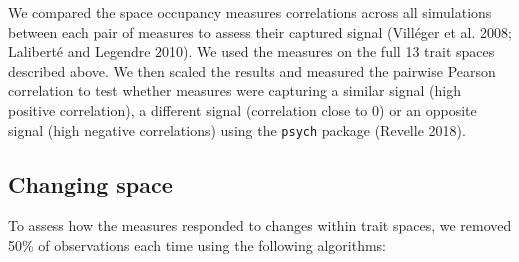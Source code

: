 \documentclass[]{article}
\begin{document}
We compared the space occupancy measures correlations across all
simulations between each pair of measures to assess their captured
signal (Villéger et al. 2008; Laliberté and Legendre 2010). We used the
measures on the full 13 trait spaces described above. We then scaled the
results and measured the pairwise Pearson correlation to test whether
measures were capturing a similar signal (high positive correlation), a
different signal (correlation close to 0) or an opposite signal (high
negative correlations) using the \texttt{psych} package (Revelle 2018).

\subsection{Changing space}\label{changing-spaces}

To assess how the measures responded to changes within trait spaces, we
removed 50\% of observations each time using the following algorithms:
\end{document}
